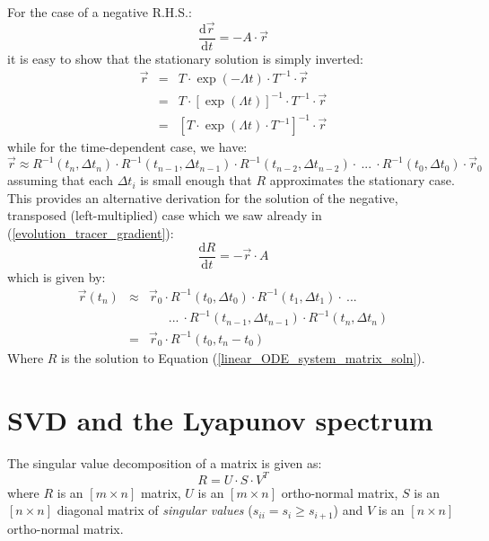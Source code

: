 \documentclass[11pt]{article}
\begin{document}
For the case of a negative R.H.S.:
\begin{equation}
\frac{\mathrm d \vec r}{\mathrm d t} = - A \cdot \vec r
\end{equation}
it is easy to show that the stationary solution is simply inverted:
\begin{eqnarray}
  \vec r & = & T \cdot \exp (-\Lambda t) \cdot T^{-1} \cdot \vec r \\
	& = & T \cdot \left [ \exp (\Lambda t) \right ]^{-1} \cdot T^{-1} \cdot \vec r \\
 & = & \left [T \cdot \exp (\Lambda t) \cdot T^{-1} \right]^{-1} \cdot \vec r 
\end{eqnarray}
while for the time-dependent case, we have:
\begin{equation}
	\vec r \approx R^{-1}(t_n,\Delta t_n) \cdot R^{-1}(t_{n-1},\Delta t_{n-1}) \cdot R^{-1}(t_{n-2}, \Delta t_{n-2}) \cdot ~ ... 
~ \cdot R^{-1}(t_0,\Delta t_0) \cdot \vec r_0
\end{equation}
assuming that each $\Delta t_i$ is small enough that $R$ approximates the 
stationary case.
This provides an alternative derivation for the solution of the negative,
transposed (left-multiplied) case which we saw already in (\ref{evolution_tracer_gradient}):
\begin{equation}
\frac{\mathrm d R}{\mathrm d t} = -\vec r \cdot A
\end{equation}
which is given by:
\begin{eqnarray}
\vec r(t_n) & \approx & \vec r_0 \cdot R^{-1}(t_0,\Delta t_0) \cdot R^{-1}(t_1, \Delta t_1) \cdot ~ ... 
~ \nonumber \\
& & ~~~~~~~...~\cdot R^{-1}(t_{n-1},\Delta t_{n-1}) \cdot R^{-1}(t_n,\Delta t_n) \\
& = & \vec r_0 \cdot R^{-1}(t_0, t_n-t_0)
\end{eqnarray}
Where $R$ is the solution to Equation (\ref{linear_ODE_system_matrix_soln}).

\section{SVD and the Lyapunov spectrum}

The singular value decomposition of a matrix is given as:
\begin{equation}
R=U\cdot S\cdot V^T
\label{SVD_def}
\end{equation}
where $R$ is an $[m \times n]$ matrix, $U$ is an $[m \times n]$ ortho-normal
matrix, $S$ is an $[n \times n]$ diagonal matrix of {\it singular values}
($s_{ii}=s_i\ge s_{i+1}$) and $V$ is an $[n \times n]$ ortho-normal matrix.
\end{document}
